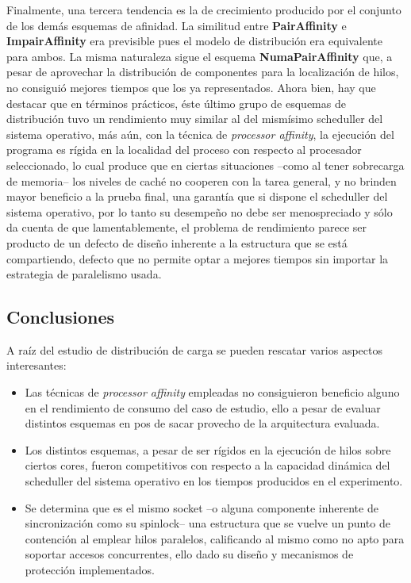 Finalmente, una tercera tendencia es la de crecimiento producido por el conjunto de los demás esquemas de afinidad. La similitud entre \textbf{PairAffinity} e \textbf{ImpairAffinity} era previsible pues el modelo de distribución era equivalente para ambos. La misma naturaleza sigue el esquema \textbf{NumaPairAffinity} que, a pesar de aprovechar la distribución de componentes para la localización de hilos, no consiguió mejores tiempos que los ya representados. Ahora bien, hay que destacar que en términos prácticos, éste último grupo de esquemas de distribución tuvo un rendimiento muy similar al del mismísimo scheduller del sistema operativo, más aún, con la técnica de \emph{processor affinity}, la ejecución del programa es rígida en la localidad del proceso con respecto al procesador seleccionado, lo cual produce que en ciertas situaciones --como al tener sobrecarga de memoria-- los niveles de caché no cooperen con la tarea general, y no brinden mayor beneficio a la prueba final, una garantía que si dispone el scheduller del sistema operativo, por lo tanto su desempeño no debe ser menospreciado y sólo da cuenta de que lamentablemente, el problema de rendimiento parece ser producto de un defecto de diseño inherente a la estructura que se está compartiendo, defecto que no permite optar a mejores tiempos sin importar la estrategia de paralelismo usada.


\subsection{Conclusiones}
A raíz del estudio de distribución de carga se pueden rescatar varios aspectos interesantes:
\begin{itemize}
\item Las técnicas de \emph{processor affinity} empleadas no consiguieron beneficio alguno en el rendimiento de consumo del caso de estudio, ello a pesar de evaluar distintos esquemas en pos de sacar provecho de la arquitectura evaluada.
\item Los distintos esquemas, a pesar de ser rígidos en la ejecución de hilos sobre ciertos cores, fueron competitivos con respecto a la capacidad dinámica del scheduller del sistema operativo en los tiempos producidos en el experimento.
\item Se determina que es el mismo socket –o alguna componente inherente de sincronización como su spinlock-- una estructura que se vuelve un punto de contención al emplear hilos paralelos, calificando al mismo como no apto para soportar accesos concurrentes, ello dado su diseño y mecanismos de protección implementados.
\end{itemize}


